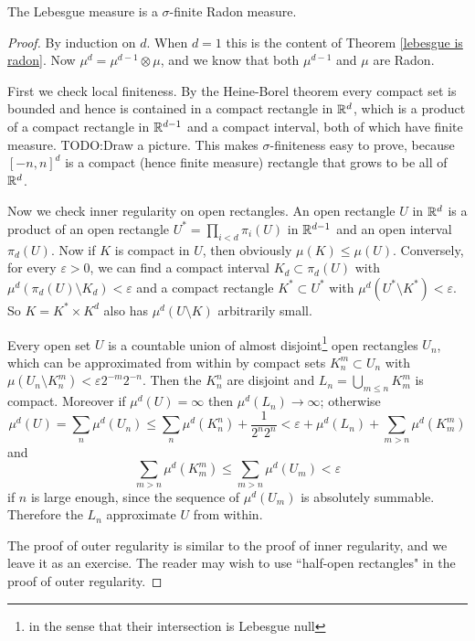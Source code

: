 \begin{theorem}
\label{lebesgue is radon 2}
The Lebesgue measure is a $\sigma$-finite Radon measure.
\end{theorem}
\begin{proof}
By induction on $d$. When $d = 1$ this is the content of Theorem \ref{lebesgue is radon}.
Now $\mu^{d} = \mu^{d-1} \otimes \mu$, and we know that both $\mu^{d-1}$ and $\mu$ are Radon.

First we check local finiteness. By the Heine-Borel theorem every compact set is bounded and hence is contained in a compact rectangle in $\mathbb{R}^d$, which is a product of a compact rectangle in $\mathbb{R}^{d-1}$ and a compact interval, both of which have finite measure.
TODO:Draw a picture.
This makes $\sigma$-finiteness easy to prove, because $[-n, n]^d$ is a compact (hence finite measure) rectangle that grows to be all of $\mathbb{R}^d$.

Now we check inner regularity on open rectangles.
An open rectangle $U$ in $\mathbb{R}^d$ is a product of an open rectangle $U^* = \prod_{i<d} \pi_i(U)$ in $\mathbb{R}^{d-1}$ and an open interval $\pi_d(U)$.
Now if $K$ is compact in $U$, then obviously $\mu(K) \leq \mu(U)$.
Conversely, for every $\varepsilon > 0$, we can find a compact interval $K_{d} \subset \pi_d(U)$ with $\mu^d(\pi_d(U) \setminus K_d) < \varepsilon$ and a compact rectangle $K^* \subset U^*$ with $\mu^d(U^* \setminus K^*) < \varepsilon$. So $K = K^* \times K^d$ also has $\mu^d(U \setminus K)$ arbitrarily small.

Every open set $U$ is a countable union of almost disjoint\footnote{in the sense that their intersection is Lebesgue null} open rectangles $U_{n}$, which can be approximated from within by compact sets $K_{n}^{m} \subset U_{n}$ with $\mu(U_{n} \setminus K_{n}^m) < \varepsilon 2^{-m}2^{-n}$. Then the $K_{n}^n$ are disjoint and $L_{n} = \bigcup_{m \leq n} K_{m}^m$ is compact.
Moreover if $\mu^d(U) = \infty$ then $\mu^d(L_{n}) \to \infty$; otherwise
\[\mu^d(U) = \sum_{n} \mu^d(U_{n}) \leq \sum_{n} \mu^d(K_{n}^n) + \frac{1}{2^n2^n} < \varepsilon + \mu^d(L_{n}) + \sum_{m > n} \mu^d(K_{m}^m)\]
and
\[\sum_{m > n} \mu^d(K_{m}^m) \leq \sum_{m > n} \mu^d(U_{m}) < \varepsilon\]
if $n$ is large enough, since the sequence of $\mu^d(U_{m})$ is absolutely summable.
Therefore the $L_{n}$ approximate $U$ from within.

The proof of outer regularity is similar to the proof of inner regularity, and we leave it as an exercise.
The reader may wish to use ``half-open rectangles" in the proof of outer regularity.
\end{proof}


